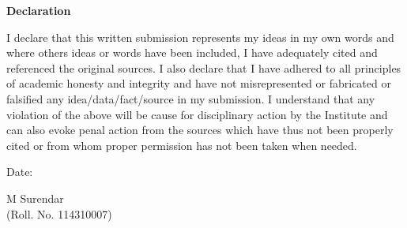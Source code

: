 \clearpage
\thispagestyle{empty}
\vspace{-1in}
\begin{center}
\Large  {\bf Declaration }
\end{center}
\vspace{0.1in}
I declare that this written submission represents my ideas in my own words and where others ideas or words have been included, I have adequately cited and referenced the original sources. I also declare that I have adhered to all principles of academic honesty and integrity and have not misrepresented or fabricated or falsified any idea/data/fact/source in my submission. I understand that any violation of the above will be cause for disciplinary action by the Institute and can also evoke penal action from the sources which have thus not been properly cited or from whom proper permission has not been taken when needed.
\vspace{0.5in}
\begin{flushleft}
Date:
\end{flushleft}
\begin{flushright}
M Surendar\\
(Roll. No. 114310007)
\end{flushright}

%
